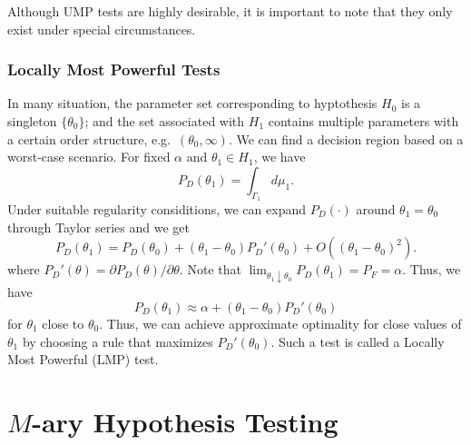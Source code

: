 Although UMP tests are highly desirable, it is important to note that they only exist under special circumstances.

\subsubsection{Locally  Most Powerful Tests}

In many situation, the parameter set corresponding to hyptothesis $H_0$ is a singleton $\{ \theta_0 \}$; and the set associated with $H_1$ contains multiple parameters with a certain order structure, e.g.~$( \theta_0, \infty)$.
We can find a decision region based on a worst-case scenario.
For fixed $\alpha$ and $\theta_1 \in H_1$, we have
\begin{equation*}
P_D (\theta_1) = \int_{\Gamma_1} d \mu_1 .
\end{equation*}
Under suitable regularity considitions, we can expand $P_D (\cdot)$ around $\theta_1 = \theta_0$ through Taylor series and we get
\begin{equation*}
P_D (\theta_1) = P_D (\theta_0) + ( \theta_1 - \theta_0 ) P_D' (\theta_0) + O \left( (\theta_1 - \theta_0)^2 \right) .
\end{equation*}
where $P_D' (\theta) = \partial P_D (\theta) / \partial \theta$.
Note that $\lim_{\theta_1 \downarrow \theta_0} P_D (\theta_1) = P_F = \alpha$.
Thus, we have
\begin{equation*}
P_D (\theta_1) \approx \alpha + ( \theta_1 - \theta_0 ) P_D' (\theta_0)
\end{equation*}
for $\theta_1$ close to $\theta_0$.
Thus, we can achieve approximate optimality for close values of $\theta_1$ by choosing a rule that maximizes $P_D' (\theta_0)$.
Such a test is called a Locally Most Powerful (LMP) test.
\newpage



\section{$M$-ary Hypothesis Testing}

